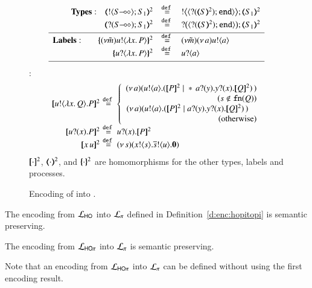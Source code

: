 \begin{figure}[t]
\[
\begin{array}{l}
	\begin{array}{rcl}
\noindent{\bf Types:}\quad 
		\tmap{\btout{\lhot{S}}S_1}{2} & \defeq & \bbtout{\chtype{\btinp{\tmap{S}{2}}\tinact}}\tmap{S_1}{2} \\
		\tmap{\btinp{\lhot{S}}S_1}{2} & \defeq & \bbtinp{\chtype{\btinp{\tmap{S}{2}}\tinact}}\tmap{S_1}{2} 
\\[1mm]
\hline
\noindent{\bf Labels:}\quad \quad 
		\mapa{(\nu \tilde{m})\bactout{u}{\abs{ x}{P}} }^2  & \defeq & (\nu \tilde{m})\news{a} \bactout{u}{a} \\
		\mapa{\bactinp{u}{\abs{ x}{P}} }^2 &  \defeq & \bactinp{u}{a}
\\[1mm]
\hline
\end{array}
\end{array}
\]
\hspace{4mm}{\bf Terms} :
\[
\begin{array}{rcll}
		\pmap{\bout{u}{\abs{x}{Q}} P}{2} &\!\!\!\! \defeq \!\!\!\!&  \left\{
		\begin{array}{r}
			\newsp{a}{\bout{u}{a} (\pmap{P}{2} \Par \repl{} \binp{a}{y} \binp{y}{x} \pmap{Q}{2})\,}\\
                  (s \notin \fn{Q}) \\
			\newsp{a}{\bout{u}{a} (\pmap{P}{2} \Par \binp{a}{y} \binp{y}{x} \pmap{Q}{2})\,}\quad\\
            \textrm{(otherwise)} %
		\end{array}
		\right.
		\\
\pmap{\binp{u}{x} P}{2} &\!\!\!\! \defeq \!\!\!\! &  \binp{u}{x} \pmap{P}{2}\\
\pmap{\appl{x}{u}}{2} & \!\!\!\! \defeq \!\!\!\! & \newsp{s}{\bout{x}{s} \bout{\dual{s}}{u} \inact}\\

	\end{array}
	\]
$[\!\![\cdot]\!\!]^2$,
$(\!\!\langle\cdot\rangle\!\!)^2$, 
and 
$\{\!\!\{\cdot\}\!\!\}^2$
are homomorphisms for the other types, labels and processes.   
	\caption{
Encoding of \HO into \sessp.
\label{f:enc:ho_to_sessp}
}
\end{figure}

\begin{theorem}
\label{f:enc:hotopi}
The encoding from $\mathcal{L}_{\mathsf{HO}}$ into $\mathcal{L}_{\pi}$ defined in 
Definition~\ref{d:enc:hopitopi} 
is semantic preserving. 
\end{theorem}

\begin{corollary}
The encoding from $\mathcal{L}_{\mathsf{HO}\pi}$ into $\mathcal{L}_{\pi}$ is semantic preserving. 
\end{corollary}

Note that an encoding from $\mathcal{L}_{\mathsf{HO}\pi}$ into $\mathcal{L}_{\pi}$
can be defined without using the first encoding result.  



